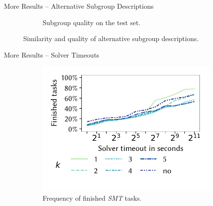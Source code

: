 \documentclass[en, navbaroff]{sdqbeamer}
\begin{document}
\begin{frame}[t]{More Results -- Alternative Subgroup Descriptions}
\begin{figure}
\begin{subfigure}[t]{0.4\textwidth}
			\caption{Subgroup quality on the test set.}
			\label{fig:csd:alternatives-test-nwracc}
		\end{subfigure}
		\caption*{
			Similarity and quality of alternative subgroup descriptions.
		}
		\label{fig:csd:alternatives:appendix}
	\end{figure}
\end{frame}

\begin{frame}[t]{More Results -- Solver Timeouts}
	\begin{figure}
		\centering
		\begin{subfigure}[t]{0.4\textwidth}
			\centering
			\includegraphics[width=\textwidth, trim=10 25 10 10, clip]{plots/csd-timeouts-finished-tasks.pdf}
			\caption{
				Frequency of finished \emph{SMT} tasks.
			}
			\label{fig:csd:timeouts-finished-tasks}
		\end{subfigure}
		\hspace{\kitcolumnsep}
		\begin{subfigure}[t]{0.4\textwidth}
			\centering

\end{subfigure}
\end{figure}
\end{frame}
\end{document}
